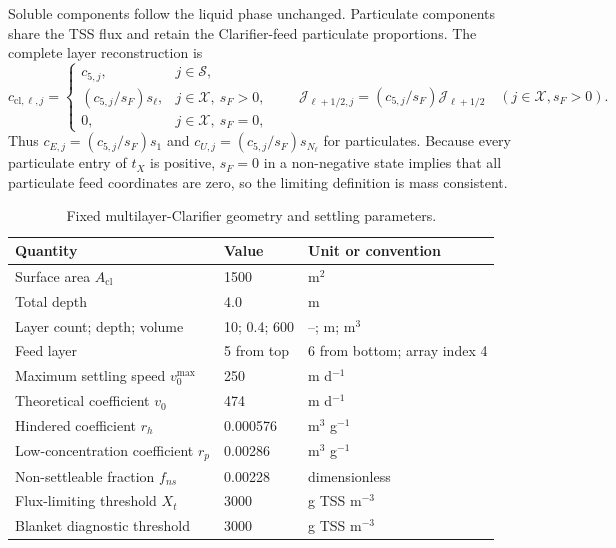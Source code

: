 \documentclass[a4paper,fleqn]{cas-sc}
\begin{document}
Soluble components follow the liquid phase unchanged. Particulate components share the TSS flux and retain the Clarifier-feed particulate proportions. The complete layer reconstruction is
\begin{equation}
\label{eq:clarifier_component_reconstruction}
c_{\mathrm{cl},\ell,j}=
\begin{cases}
c_{5,j},&j\in\mathcal S,\\
(c_{5,j}/s_F)s_\ell,&j\in\mathcal X,\ s_F>0,\\
0,&j\in\mathcal X,\ s_F=0,
\end{cases}
\qquad
\mathcal J_{\ell+1/2,j}=(c_{5,j}/s_F)\mathcal J_{\ell+1/2}
\quad(j\in\mathcal X, s_F>0).
\end{equation}
Thus $c_{E,j}=(c_{5,j}/s_F)s_1$ and $c_{U,j}=(c_{5,j}/s_F)s_{N_\ell}$ for particulates. Because every particulate entry of $t_X$ is positive, $s_F=0$ in a non-negative state implies that all particulate feed coordinates are zero, so the limiting definition is mass consistent.

\begin{table}[htbp]
\centering
\caption{Fixed multilayer-Clarifier geometry and settling parameters.}
\label{tab:clarifier_parameters}
\scriptsize
\begin{tabular}{lll}
\toprule
Quantity & Value & Unit or convention \\
\midrule
Surface area $A_{\mathrm{cl}}$ & 1500 & m$^2$ \\
Total depth & 4.0 & m \\
Layer count; depth; volume & 10; 0.4; 600 & --; m; m$^3$ \\
Feed layer & 5 from top & 6 from bottom; array index 4 \\
Maximum settling speed $v_0^{\max}$ & 250 & m d$^{-1}$ \\
Theoretical coefficient $v_0$ & 474 & m d$^{-1}$ \\
Hindered coefficient $r_h$ & 0.000576 & m$^3$ g$^{-1}$ \\
Low-concentration coefficient $r_p$ & 0.00286 & m$^3$ g$^{-1}$ \\
Non-settleable fraction $f_{ns}$ & 0.00228 & dimensionless \\
Flux-limiting threshold $X_t$ & 3000 & g TSS m$^{-3}$ \\
Blanket diagnostic threshold & 3000 & g TSS m$^{-3}$ \\
\bottomrule
\end{tabular}
\end{table}
\end{document}
